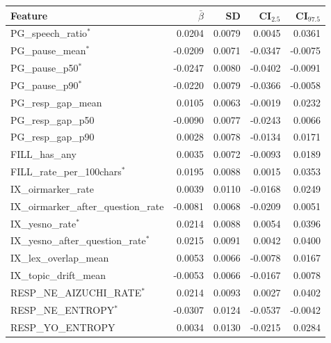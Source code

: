 \begin{tabular}{lrrrr}
\toprule
Feature & $\bar{\beta}$ & SD & CI$_{2.5}$ & CI$_{97.5}$ \\
\midrule
PG\_speech\_ratio$^{*}$ & 0.0204 & 0.0079 & 0.0045 & 0.0361 \\
PG\_pause\_mean$^{*}$ & -0.0209 & 0.0071 & -0.0347 & -0.0075 \\
PG\_pause\_p50$^{*}$ & -0.0247 & 0.0080 & -0.0402 & -0.0091 \\
PG\_pause\_p90$^{*}$ & -0.0220 & 0.0079 & -0.0366 & -0.0058 \\
PG\_resp\_gap\_mean & 0.0105 & 0.0063 & -0.0019 & 0.0232 \\
PG\_resp\_gap\_p50 & -0.0090 & 0.0077 & -0.0243 & 0.0066 \\
PG\_resp\_gap\_p90 & 0.0028 & 0.0078 & -0.0134 & 0.0171 \\
FILL\_has\_any & 0.0035 & 0.0072 & -0.0093 & 0.0189 \\
FILL\_rate\_per\_100chars$^{*}$ & 0.0195 & 0.0088 & 0.0015 & 0.0353 \\
IX\_oirmarker\_rate & 0.0039 & 0.0110 & -0.0168 & 0.0249 \\
IX\_oirmarker\_after\_question\_rate & -0.0081 & 0.0068 & -0.0209 & 0.0051 \\
IX\_yesno\_rate$^{*}$ & 0.0214 & 0.0088 & 0.0054 & 0.0396 \\
IX\_yesno\_after\_question\_rate$^{*}$ & 0.0215 & 0.0091 & 0.0042 & 0.0400 \\
IX\_lex\_overlap\_mean & 0.0053 & 0.0066 & -0.0078 & 0.0167 \\
IX\_topic\_drift\_mean & -0.0053 & 0.0066 & -0.0167 & 0.0078 \\
RESP\_NE\_AIZUCHI\_RATE$^{*}$ & 0.0214 & 0.0093 & 0.0027 & 0.0402 \\
RESP\_NE\_ENTROPY$^{*}$ & -0.0307 & 0.0124 & -0.0537 & -0.0042 \\
RESP\_YO\_ENTROPY & 0.0034 & 0.0130 & -0.0215 & 0.0284 \\
\bottomrule
\end{tabular}
